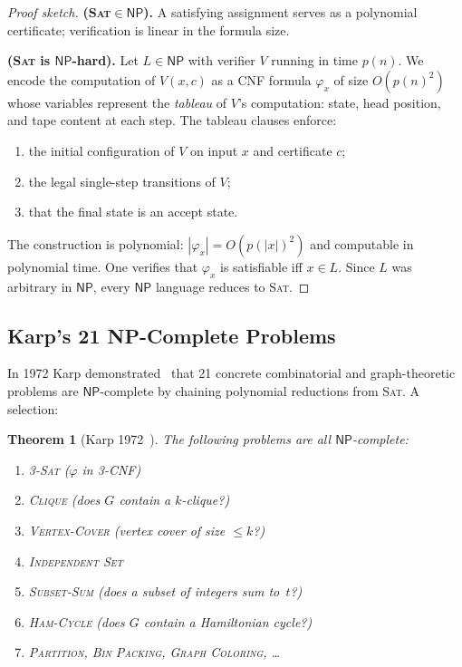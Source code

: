 \documentclass[12pt,a4paper]{amsart}
\newtheorem{theorem}{Theorem}[section]
\theoremstyle{definition}
\newcommand{\NP}{\mathsf{NP}}
\newcommand{\SAT}{\textsc{Sat}}
\newcommand{\CLIQUE}{\textsc{Clique}}
\newcommand{\VC}{\textsc{Vertex-Cover}}
\newcommand{\SUBSET}{\textsc{Subset-Sum}}
\newcommand{\HAM}{\textsc{Ham-Cycle}}
\begin{document}
\begin{proof}[Proof sketch]
\textbf{(\SAT{}$\in\NP$).}  A satisfying assignment serves as a polynomial
certificate; verification is linear in the formula size.

\textbf{(\SAT{} is $\NP$-hard).}  Let $L\in\NP$ with verifier $V$ running in
time $p(n)$.  We encode the computation of $V(x,c)$ as a CNF formula
$\varphi_{x}$ of size $O(p(n)^2)$ whose variables represent the
\emph{tableau} of $V$'s computation: state, head position, and tape content at
each step.  The tableau clauses enforce:
\begin{enumerate}[label=(\roman*)]
  \item the initial configuration of $V$ on input $x$ and certificate $c$;
  \item the legal single-step transitions of $V$;
  \item that the final state is an accept state.
\end{enumerate}
The construction is polynomial: $|\varphi_x| = O(p(|x|)^2)$ and computable
in polynomial time.  One verifies that $\varphi_x$ is satisfiable iff $x\in L$.
Since $L$ was arbitrary in $\NP$, every $\NP$ language reduces to \SAT{}.
\end{proof}

\subsection{Karp's 21 NP-Complete Problems}

In 1972 Karp demonstrated~\cite{karp1972} that 21 concrete combinatorial and
graph-theoretic problems are $\NP$-complete by chaining polynomial reductions
from \SAT{}.  A selection:

\begin{theorem}[Karp 1972~\cite{karp1972}]
The following problems are all $\NP$-complete:
\begin{enumerate}[label=(\arabic*)]
  \item \textsc{3-Sat} ($\varphi$ in 3-CNF)
  \item \CLIQUE{} (does $G$ contain a $k$-clique?)
  \item \VC{} (vertex cover of size $\leq k$?)
  \item \textsc{Independent Set}
  \item \SUBSET{} (does a subset of integers sum to~$t$?)
  \item \HAM{} (does $G$ contain a Hamiltonian cycle?)
  \item \textsc{Partition}, \textsc{Bin Packing}, \textsc{Graph Coloring}, \ldots
\end{enumerate}
\end{theorem}
\end{document}
